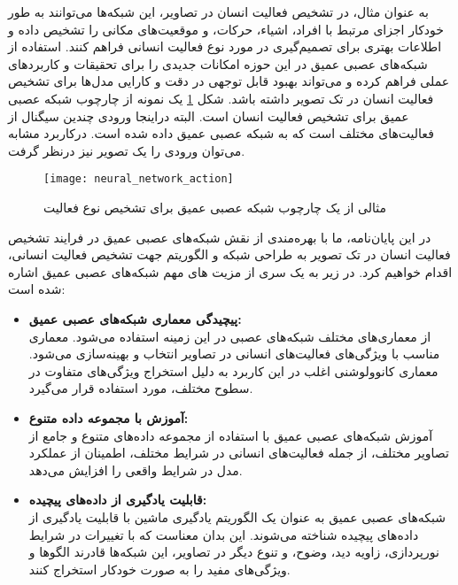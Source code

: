 به عنوان مثال، در تشخیص فعالیت انسان در تصاویر، این شبکه‌ها می‌توانند به طور خودکار اجزای مرتبط با افراد، اشیاء، حرکات، و موقعیت‌های مکانی را تشخیص داده و اطلاعات بهتری برای تصمیم‌گیری در مورد نوع فعالیت انسانی فراهم کنند.
استفاده از شبکه‌های عصبی عمیق در این حوزه امکانات جدیدی را برای تحقیقات و کاربردهای عملی فراهم کرده و می‌تواند بهبود قابل توجهی در دقت و کارایی مدل‌ها برای تشخیص فعالیت انسان در تک تصویر داشته باشد. شکل %
\ref{fig:neural_network_action_first}
یک نمونه از چارچوب شبکه عصبی عمیق برای تشخیص فعالیت انسان است. البته دراینجا ورودی چندین سیگنال از فعالیت‌های مختلف است که به شبکه عصبی عمیق داده شده است. درکاربرد مشابه می‌توان ورودی را یک تصویر نیز درنظر گرفت.
\begin{figure}[ht]
	\centerline{\texttt{[image: neural\_network\_action]}}
	\caption{
		مثالی از یک چارچوب شبکه عصبی عمیق برای تشخیص نوع فعالیت
		\cite{WinNT}
	}
	\label{fig:neural_network_action_first}
\end{figure}

در این پایان‌نامه، ما با بهره‌مندی از نقش شبکه‌های عصبی عمیق در فرایند تشخیص فعالیت انسان در تک تصویر به طراحی شبکه و الگوریتم جهت تشخیص فعالیت انسانی، اقدام خواهیم کرد. در زیر به یک سری از مزیت های مهم شبکه‌های عصبی عمیق اشاره شده است:
\begin{itemize}
	\item \textbf{پیچیدگی معماری شبکه‌های عصبی عمیق:}\\
از معماری‌های مختلف شبکه‌های عصبی در این زمینه استفاده می‌شود. معماری مناسب با ویژگی‌های فعالیت‌های انسانی در تصاویر انتخاب و بهینه‌سازی می‌شود. معماری کانوولوشنی%
اغلب در این کاربرد به دلیل استخراج ویژگی‌های متفاوت در سطوح مختلف، مورد استفاده قرار می‌گیرد. 

	\item \textbf{آموزش با مجموعه داده متنوع:}\\
آموزش شبکه‌های عصبی عمیق با استفاده از مجموعه داده‌های متنوع و جامع از تصاویر مختلف، از جمله فعالیت‌های انسانی در شرایط مختلف، اطمینان از عملکرد مدل در شرایط واقعی را افزایش می‌دهد.

\item \textbf{قابلیت یادگیری از داده‌های پیچیده:}\\
شبکه‌های عصبی عمیق به عنوان یک الگوریتم یادگیری ماشین با قابلیت یادگیری از داده‌های پیچیده شناخته می‌شوند. این بدان معناست که با تغییرات در شرایط نورپردازی، زاویه دید، وضوح، و تنوع دیگر در تصاویر، این شبکه‌ها قادرند الگوها و ویژگی‌های مفید را به صورت خودکار استخراج کنند.
\end{itemize}

